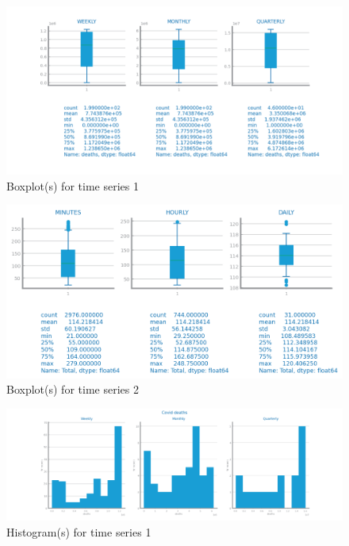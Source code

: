 \documentclass[10pt]{extarticle}
\begin{document}
\begin{figure}[H]
\centering\includegraphics[scale=0.80]{images/dataset1/time_series/Covid_distribution_boxplot.png}
\caption{Boxplot(s) for time series 1}
\end{figure}

\begin{figure}[H]
\centering\includegraphics[scale=0.8]{dataset2/time_series/fts_boxplot.png}
\caption{Boxplot(s) for time series 2}
\end{figure}

\begin{figure}[H]
\centering\includegraphics[scale=0.5]{dataset1/time_series/Covid_distribution_histogram.png}
\caption{Histogram(s) for time series 1}
\end{figure}
\end{document}
